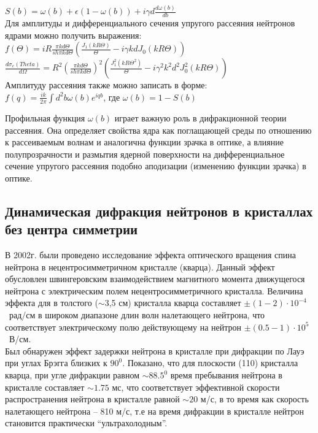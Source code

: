 \documentclass[11pt]{report}
\begin{document}
$S(b)=\omega(b) + \epsilon (1-\omega (b)) + i\gamma d \frac{d\omega (b)}{db}$ \\


Для амплитуды и дифференциального сечения упругого рассеяния нейтронов ядрами можно получить выражения: \\

$f(\Theta) = iR\frac{\pi kd\Theta}{sh\pi kd\Theta}(\frac{J_1(kR\Theta)}{\Theta} - i\gamma kdJ_0(kR\Theta)) $ \\

$\frac{d\sigma_e(Theta)}{d\Omega} = R^2(\frac{\pi kd\Theta}{sh\pi kd\Theta})^2 (\frac{J_1^2(kR\Theta^2)}{\Theta} - i\gamma^2 k^2d^2J_0^2(kR\Theta)) $ \\

Амплитуду рассеяния также можно записать в форме: \\

$f(q)=\frac{ik}{2\pi}\int d^2b\omega(b)e^{iqb}$, где $\omega(b) = 1-S(b)$

Профильная функция $\omega(b)$ играет важную роль в дифракционной теории рассеяния. Она определяет свойства ядра как поглащающей среды по отношению к рассеиваемым волнам и аналогична функции зрачка в оптике, а влияние полупрозрачности и размытия ядерной поверхности на дифференциальное сечение упругого рассеяния подобно аподизации (изменению функции зрачка) в оптике.

\subsection{Динамическая дифракция нейтронов в кристаллах без центра симметрии}
В 2002г. были проведено исследование эффекта оптического вращения спина нейтрона в нецентросимметричном кристалле (кварца). Данный эффект обусловлен швингеровским взаимодействием магнитного момента движущегося нейтрона с электрическим полем нецентросимметричного кристалла. Величина эффекта для в толстого ($\sim$3,5 см) кристалла кварца составляет $\pm (1 - 2)\cdot 10^{-4}$~рад/см в широком диапазоне длин волн налетающего нейтрона, что соответствует электрическому полю действующему на нейтрон $\pm (0.5 - 1)\cdot 10^{5}$~В/см.  \\

Был обнаружен эффект задержки нейтрона в кристалле при дифракции по Лауэ при углах Брэгга близких к $90^0$. Показано, что для плоскости (110) кристалла кварца, при угле дифракции равном $\sim 88.5^0$ время пребывания нейтрона в кристалле составляет $\sim 1.75 $ мс, что соответствует эффективной скорости распространения нейтрона в кристалле равной $\sim 20$ м/с, в то время как скорость налетающего нейтрона -- 810 м/с, т.е на время дифракции в кристалле нейтрон становится практически ``ультрахолодным''. ~\cite{rffi_o_216479} \\
\end{document}
